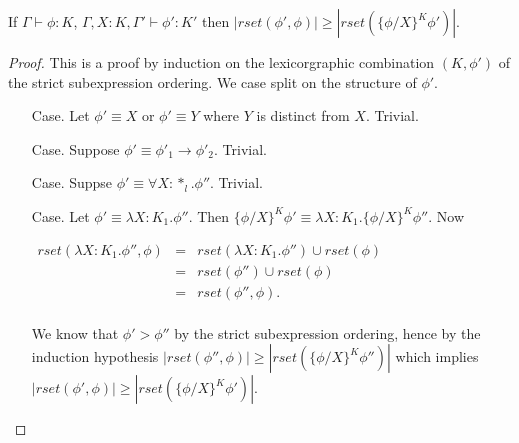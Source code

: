 \begin{lemma}
  \label{lemma:redex_preserving_tl_ssfw}
  If $\Gamma \vdash \phi : K$, $\Gamma, X:K, \Gamma' \vdash \phi':K'$
  then  $|rset(\phi', \phi)| \geq |rset(\{\phi/X\}^K \phi')|$.
\end{lemma}
\begin{proof}
  This is a proof by induction on the lexicorgraphic combination
  $(K, \phi')$ of the strict subexpression ordering.
  We case split on the structure of $\phi'$.  
  
  \begin{itemize}
  \item[Case.] Let $\phi' \equiv X$ or $\phi' \equiv Y$ where $Y$ is distinct from $X$.  Trivial. 

  \item[Case.] Suppose $\phi' \equiv \phi'_1 \to \phi'_2$.  Trivial.
    
  \item[Case.] Suppse $\phi' \equiv \forall X:*_l.\phi''$.  Trivial.
  
  \item[Case.] Let $\phi' \equiv \lambda X:K_1.\phi''$.  Then $\{\phi/X\}^K \phi' \equiv \lambda X:K_1.\{\phi/X\}^K \phi''$.
    Now 
    \begin{center}
      \begin{math}
        \begin{array}{lll}
          rset(\lambda X:K_1.\phi'', \phi) & = & rset(\lambda X:K_1.\phi'') \cup rset(\phi)\\
          & = & rset(\phi'') \cup rset(\phi)\\
          & = & rset(\phi'', \phi).\\
        \end{array}
      \end{math}
    \end{center}
    We know that $\phi' > \phi''$ by the strict subexpression ordering, hence by the induction hypothesis
    $|rset(\phi'', \phi)| \geq |rset(\{\phi/X\}^K \phi'')|$ which implies $|rset(\phi', \phi)| \geq |rset(\{\phi/X\}^K \phi')|$.
    

\end{itemize}
\end{proof}
